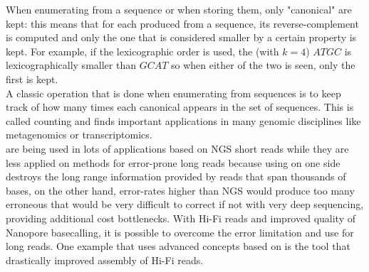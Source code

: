 When enumerating \kmers from a sequence or when storing them, only "canonical" \kmers are kept: this means that for each \kmer produced from a sequence, its reverse-complement is computed and only the one that is considered smaller by a certain property is kept. For example, if the lexicographic order is used, the \kmer (with $k=4$) $ATGC$ is lexicographically smaller than $GCAT$ so when either of the two is seen, only the first is kept.\\
A classic operation that is done when enumerating \kmers from sequences is to keep track of how many times each canonical \kmer appears in the set of sequences. This is called \kmer counting and finds important applications in many genomic disciplines like metagenomics or transcriptomics.\\
\kmers are being used in lots of applications based on NGS short reads while they are less applied on methods for error-prone long reads because using \kmers on one side destroys the long range information provided by reads that span thousands of bases, on the other hand, error-rates higher than NGS would produce too many erroneous \kmers that would be very difficult to correct if not with very deep sequencing, providing additional cost bottlenecks. With Hi-Fi reads and improved quality of Nanopore basecalling, it is possible to overcome the error limitation and use \kmers for long reads. One example that uses advanced concepts based on \kmers is the tool \mdbg that drastically improved assembly of Hi-Fi reads.\\ 

